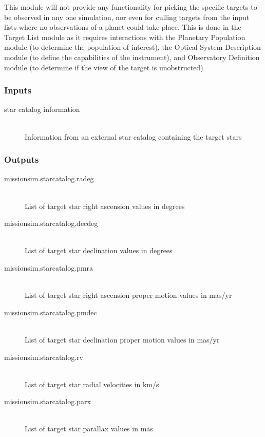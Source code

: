 \documentclass[]{asme2ej}
\begin{document}
This module will not provide any functionality for picking the specific targets to be observed in any one simulation, nor even for culling targets from the input lists where no observations of a planet could take place.  This is done in the Target List module as it requires interactions with the Planetary Population module (to determine the population of interest), the Optical System Description module (to define the capabilities of the instrument), and Observatory Definition module (to determine if the view of the target is unobstructed).

\subsubsection{Inputs}
\begin{description}
    \item[star catalog information] \hfill \\
    Information from an external star catalog containing the target stars
\end{description}

\subsubsection{Outputs} \label{starcatalog}
\begin{description}
    \item[missionsim.starcatalog.radeg] \hfill \\
    List of target star right ascension values in degrees
    \item[missionsim.starcatalog.decdeg] \hfill \\
    List of target star declination values in degrees
    \item[missionsim.starcatalog.pmra] \hfill \\
    List of target star right ascension proper motion values in mas/yr
    \item[missionsim.starcatalog.pmdec] \hfill \\
    List of target star declination proper motion values in mas/yr
    \item[missionsim.starcatalog.rv] \hfill \\
    List of target star radial velocities in km/s
    \item[missionsim.starcatalog.parx] \hfill \\
    List of target star parallax values in mas
\end{description}
\end{document}

